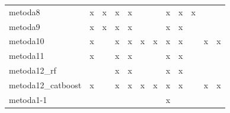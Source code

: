 \begin{table}[h!]
\begin{tabular}{|l|c|c|c|c|c|c|c|c|c|c|c|}
		metoda8            & x                          & x                        & x                      & x                        &                          &                     & x                       & x                             & x                       &                                &                                       \\
		metoda9            & x                          & x                        & x                      & x                        &                          &                     & x                       & x                             &                         &                                &                                       \\
		metoda10           & x                          &                          & x                      & x                        & x                        & x                   & x                       & x                             &                         & x                              & x                                     \\
		metoda11           & x                          &                          & x                      & x                        &                          &                     & x                       & x                             &                         &                                &                                       \\
		metoda12\_rf       &                            &                          & x                      & x                        &                          &                     & x                       & x                             &                         &                                &                                       \\
		metoda12\_catboost & x                          &                          & x                      & x                        & x                        & x                   & x                       & x                             &                         & x                              & x                                     \\
		metoda1-1          &                            &                          &                        &                          &                          &                     & x                       &                               &                         &                                &                                       \\

\end{tabular}
\end{table}
